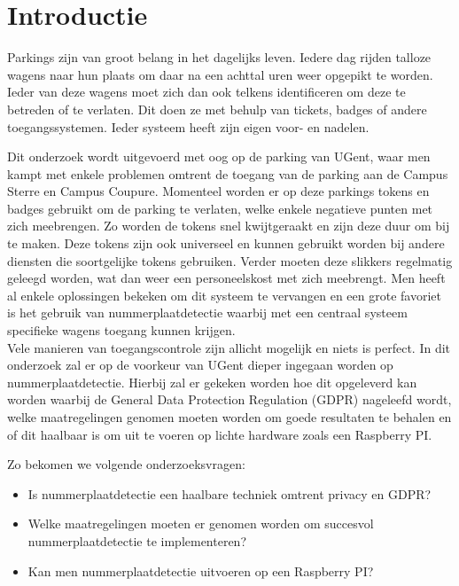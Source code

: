 
\section{Introductie} %
\label{sec:introductie}

Parkings zijn van groot belang in het dagelijks leven. Iedere dag rijden talloze wagens naar hun plaats om daar na een achttal uren weer opgepikt te worden. Ieder van deze wagens moet zich dan ook telkens identificeren om deze te betreden of te verlaten. Dit doen ze met behulp van tickets, badges of andere toegangssystemen. Ieder systeem heeft zijn eigen voor- en nadelen.

Dit onderzoek wordt uitgevoerd met oog op de parking van UGent, waar men kampt met enkele problemen omtrent de toegang van de parking aan de Campus Sterre en Campus Coupure. Momenteel worden er op deze parkings tokens en badges gebruikt om de parking te verlaten, welke enkele negatieve punten met zich meebrengen. Zo worden de tokens snel kwijtgeraakt en zijn deze duur om bij te maken. Deze tokens zijn ook universeel en kunnen gebruikt worden bij andere diensten die soortgelijke tokens gebruiken. Verder moeten deze slikkers regelmatig geleegd worden, wat dan weer een personeelskost met zich meebrengt. Men heeft al enkele oplossingen bekeken om dit systeem te vervangen en een grote favoriet is het gebruik van nummerplaatdetectie waarbij met een centraal systeem specifieke wagens toegang kunnen krijgen.
\\
Vele manieren van toegangscontrole zijn allicht mogelijk en niets is perfect. In dit onderzoek zal er op de voorkeur van UGent dieper ingegaan worden op nummerplaatdetectie. Hierbij zal er gekeken worden hoe dit opgeleverd kan worden waarbij de General Data Protection Regulation (GDPR) nageleefd wordt, welke maatregelingen genomen moeten worden om goede resultaten te behalen en of dit haalbaar is om uit te voeren op lichte hardware zoals een Raspberry PI.

Zo bekomen we volgende onderzoeksvragen:
\begin{itemize}
	\item Is nummerplaatdetectie een haalbare techniek omtrent privacy en GDPR?
	\item Welke maatregelingen moeten er genomen worden om succesvol nummerplaatdetectie te implementeren?
	\item Kan men nummerplaatdetectie uitvoeren op een Raspberry PI?
\end{itemize}


